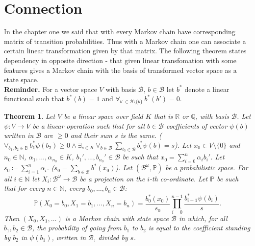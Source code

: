 \documentclass[a4paper, 12pt]{article}
\newtheorem{theorem}{Theorem}
\newcommand{\ndotsm}[3]{{#1}_{#2}, \dots, {#1}_{#3}}
\begin{document}
\section{Connection}\label{three}
\indent In the chapter one we said that with every Markov chain  have corresponding matrix of transition
probabilities. Thus with a Markov chain one can associate a certain linear transformation given by that
matrix. The following theorem states dependency in opposite direction - that given linear transfomation
with some features gives a Markov chain with the basis of transformed vector space as a state space. \\[8pt]
\indent\textbf{Reminder. } For a vector space $V$ with basis $\mathcal{B}$,
$b \in \mathcal{B}$ let $b^*$
denote a linear functional such that $b^*(b) = 1$ and
$\forall_{b' \in \mathcal{B}\setminus \{b\}}\ b^*(b') = 0$.
\begin{theorem}\label{theorem}
Let $V$ be a linear space over field $K$ that is $\mathbb{R}$ or $\mathbb{Q}$,
 with basis $\mathcal{B}$.
Let $\psi : V \to V$ be a linear operation such that for
all $b \in \mathcal{B}$ coefficients of vector $\psi(b)$ written in $\mathcal{B}$ are $\geq 0$ and their
sum $s$ is the same.
($\forall_{b_1, b_2 \in \mathbb{B}}\ b_1^*\psi(b_2) \geq 0 \land \exists_{s \in K}\ \forall_{b \in
\mathcal{B}}\ \displaystyle\sum_{b_i \in \mathcal{B}}b_i^*\psi(b) = s$).
Let $x_0 \in V\setminus\{0\}$ and
$n_0 \in \mathbb{N}$, $\alpha_1, \dots, \alpha_{n_0} \in K$, $b_1', \dots, b_{n_0}' \in \mathcal{B}$
be such that $x_0 = \displaystyle\sum_{i = 0}^n \alpha_i b_i'$. Let $s_0 \coloneqq
\displaystyle\sum_{i = 1}^n \alpha_i$. ($s_0 = \displaystyle\sum_{b \in \mathcal{B}} b^*(x_0)$).
Let $(\mathcal{B}^\omega, \mathbb{P})$ be a probabilistic space. For all $i \in \mathbb{N}$ let
$X_i : \mathcal{B}^\omega \to \mathcal{B}$ be a projection on the $i$-th co-ordinate.
Let $\mathbb{P}$ be such that for every $n \in \mathbb{N}$, every
$\ndotsm{b}{0}{n} \in \mathcal{B}$:
\begin{equation*}
\mathbb{P}(X_0 = b_0, X_1 = b_1, \dots, X_n = b_n) =
\frac{b_0^*(x_0)}{s_0}\prod_{i = 0}^{n-1}\frac{b_{i+1}^*\psi(b_i)}{s}.
\end{equation*}
Then $(X_0, X_1, \dots)$ is a Markov chain with state space $\mathcal{B}$
in which, for all $b_1, b_2 \in \mathcal{B}$, the probability of going from $b_1$ to $b_2$ is equal to the
coefficient standing by $b_2$ in $\psi(b_1)$, written in $\mathcal{B}$, divided by $s$.
\end{theorem}
\end{document}
